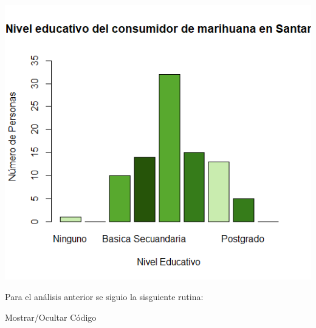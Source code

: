 \documentclass[
]{article}
\begin{document}
\includegraphics{images/marihuana eduacion santander.png}

Para el análisis anterior se siguio la sisguiente rutina:

Mostrar/Ocultar Código
\end{document}
